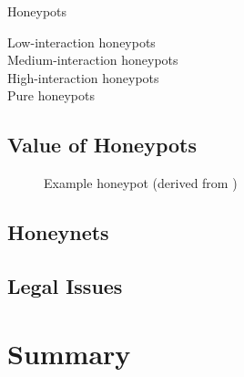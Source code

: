 Honeypots 

Low-interaction honeypots\\

Medium-interaction honeypots\\

High-interaction honeypots\\

Pure honeypots\\




\subsection{Value of Honeypots}

\begin{figure}[h]
    \centering
    
    \caption{Example honeypot (derived from \cite{Spitzner2003})}
    \label{fig:cloud-functionalities}
\end{figure}


\subsection{Honeynets}

\cite{Spitzner2003}

\subsection{Legal Issues}

\cite{Spitzner2003}

\section{Summary}

